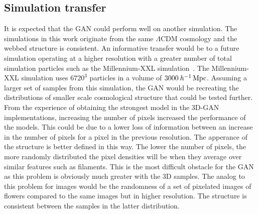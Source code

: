 \documentclass[twocolumn]{article}
\numberwithin{equation}{section}
\begin{document}



\subsection{Simulation transfer}
It is expected that the GAN could perform well on another simulation. The simulations in this work originate from the same 
$\Lambda \text{CDM}$ cosmology and the webbed structure is consistent. An informative transfer would be to a future 
simulation operating at a higher resolution with a greater number of total simulation particles such as the Millennium-XXL 
simulation~\cite{millxxlsim}. The Millennium-XXL simulation uses $6720^3$ particles in a volume of $3000 \: h^{-1} 
\,\textup{Mpc}$. Assuming a larger set of samples from this simulation, the GAN would be recreating the distributions of 
smaller scale cosmological structure that could be tested further. From the experience of obtaining the strongest model in
the 3D-GAN implementations, increasing the number of pixels increased the performance of the models. This could be due to 
a lower loss of information between an increase in the number of pixels for a pixel in the previous resolution. The 
apperance of the structure is better defined in this way. The lower the number of pixels, the more randomly distributed 
the pixel densities will be when they average over similar features such as filaments. This is the most difficult obstacle
for the GAN as this problem is obviously much greater with the 3D samples. The analog to this problem for images would be
the randomness of a set of pixelated images of flowers compared to the same images but in higher resolution. The structure
is consistent between the samples in the latter distribution. 
\end{document}
